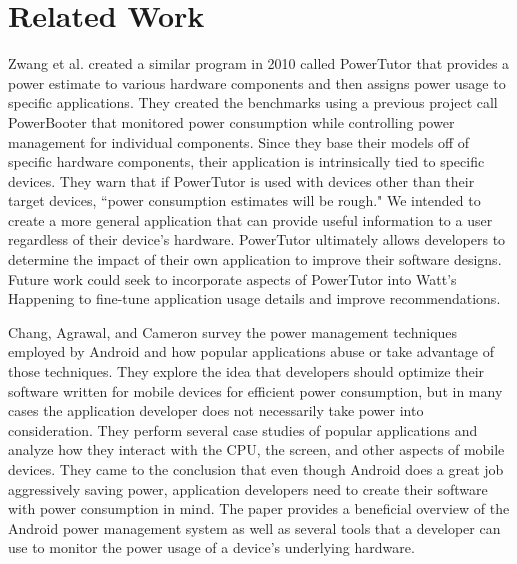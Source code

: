 \section{Related Work}
\label{sec:related}
Zwang et al.\cite{Zhang:2010:AOP:1878961.1878982} created a similar program in 2010 called PowerTutor that provides a power estimate to various hardware components and then assigns power usage to specific applications.  
They created the benchmarks using a previous project call PowerBooter that monitored power consumption while controlling power management for individual components. 
Since they base their models off of specific hardware components, their application is intrinsically tied to specific devices.
They warn that if PowerTutor is used with devices other than their target devices, ``power consumption estimates will be rough."
We intended to create a more general application that can provide useful information to a user regardless of their device's hardware. 
PowerTutor ultimately allows developers to determine the impact of their own application to improve their software designs.  
Future work could seek to incorporate aspects of PowerTutor into Watt's Happening to fine-tune application usage details and improve recommendations.

Chang, Agrawal, and Cameron survey the power management techniques employed by Android and how popular applications abuse or take advantage of those techniques\cite{energy-aware}.
They explore the idea that developers should optimize their software written for mobile devices for efficient power consumption, but in many cases the application developer does not necessarily take power into consideration. 
They perform several case studies of popular applications and analyze how they interact with the CPU, the screen, and other aspects of mobile devices. 
They came to the conclusion that even though Android does a great job aggressively saving power, application developers need to create their software with power consumption in mind. 
The paper provides a beneficial overview of the Android power management system as well as several tools that a developer can use to monitor the power usage of a device's underlying hardware. 

